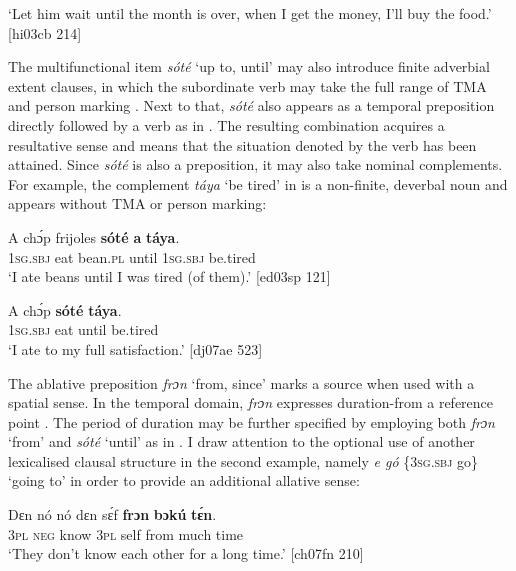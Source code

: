 \glt ‘Let him wait until the month is over, when I get the money, I’ll buy the food.’ [hi03cb 214]
\z

The multifunctional item \textit{sóté} ‘up to, until’ may also introduce finite adverbial extent clauses, in which the subordinate verb may take the full range of TMA and person marking . Next to that, \textit{sóté} also appears as a temporal preposition directly followed by a verb as in . The resulting combination acquires a resultative sense and means that the situation denoted by the verb has been attained. Since \textit{sóté} is also a preposition, it may also take nominal complements. For example, the complement \textit{táya} ‘be tired’ in  is a non-finite, deverbal noun and appears without TMA or person marking: 


\ea%
    \label{ex:key:1028}
    \gll A    chɔ́p  frijoles  \textbf{sóté}    \textbf{a}    \textbf{táya}.\\
\textsc{1sg.sbj}  eat    bean.\textsc{pl}  until  \textsc{1sg.sbj}  be.tired\\

\glt ‘I ate beans until I was tired (of them).’ [ed03sp 121]
\z


\ea%
    \label{ex:key:1029}
    \gll A    chɔ́p  \textbf{sóté}    \textbf{táya}.\\
\textsc{1sg.sbj}  eat    until  be.tired\\

\glt ‘I ate to my full satisfaction.’ [dj07ae 523]
\z

The ablative preposition \textit{frɔn} ‘from, since’ marks a source when used with a spatial sense. In the temporal domain, \textit{frɔn} expresses duration-from a reference point . The period of duration may be further specified by employing both \textit{frɔn} ‘from’ and \textit{sóté} ‘until’ as in . I draw attention to the optional use of another lexicalised clausal structure in the second example, namely\textit{ e gó} \{\textsc{3sg.sbj} go\textsc{\}} ‘going to’ in order to provide an additional allative sense:


\ea%
    \label{ex:key:1030}
    \gll Dɛn  nó  nó    dɛn  sɛ́f   \textbf{frɔn}     \textbf{bɔkú}   \textbf{tɛ́n}.\\
\textsc{3pl}  \textsc{neg}  know  \textsc{3pl}  self  from  much  time\\

\glt ‘They don’t know each other for a long time.’ [ch07fn 210]
\z


